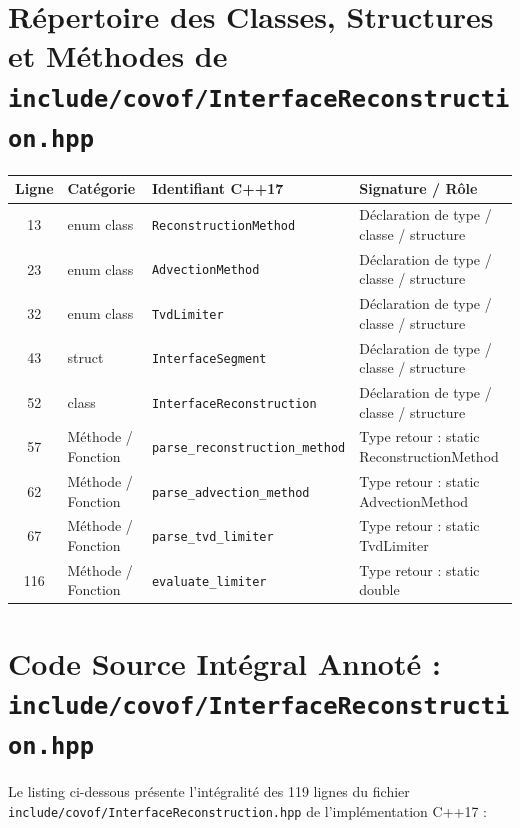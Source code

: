 \documentclass[10pt,a4paper,oneside]{book}
\begin{document}
\section{Répertoire des Classes, Structures et Méthodes de \texttt{include/covof/InterfaceReconstruction.hpp}}
\begin{center}\small
\begin{tabular}{clll}
\toprule
\textbf{Ligne} & \textbf{Catégorie} & \textbf{Identifiant C++17} & \textbf{Signature / Rôle} \\
\midrule
13 & enum class & \texttt{ReconstructionMethod} & Déclaration de type / classe / structure \\
23 & enum class & \texttt{AdvectionMethod} & Déclaration de type / classe / structure \\
32 & enum class & \texttt{TvdLimiter} & Déclaration de type / classe / structure \\
43 & struct & \texttt{InterfaceSegment} & Déclaration de type / classe / structure \\
52 & class & \texttt{InterfaceReconstruction} & Déclaration de type / classe / structure \\
57 & Méthode / Fonction & \texttt{parse\_reconstruction\_method} & Type retour : static ReconstructionMethod \\
62 & Méthode / Fonction & \texttt{parse\_advection\_method} & Type retour : static AdvectionMethod \\
67 & Méthode / Fonction & \texttt{parse\_tvd\_limiter} & Type retour : static TvdLimiter \\
116 & Méthode / Fonction & \texttt{evaluate\_limiter} & Type retour : static double \\
\bottomrule
\end{tabular}
\end{center}

\section{Code Source Intégral Annoté : \texttt{include/covof/InterfaceReconstruction.hpp}}
Le listing ci-dessous présente l'intégralité des 119 lignes du fichier \texttt{include/covof/InterfaceReconstruction.hpp} de l'implémentation C++17 :
\end{document}
